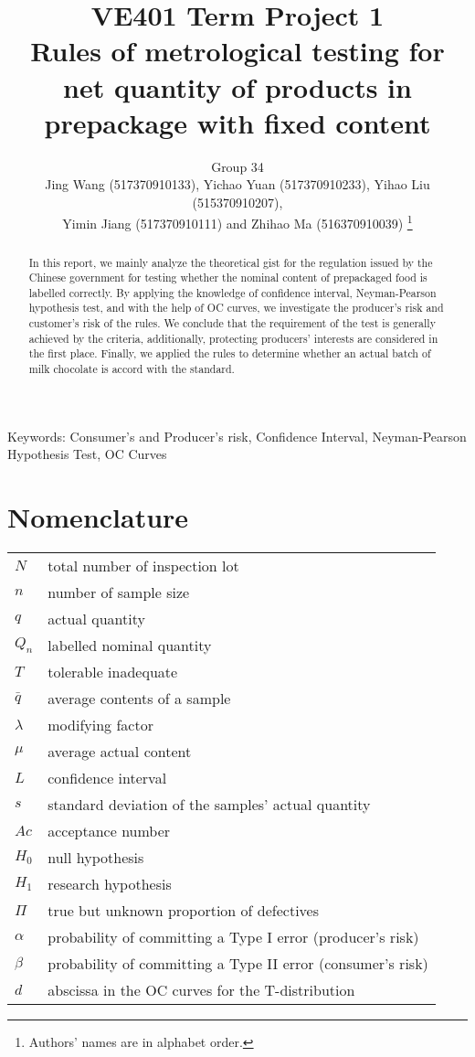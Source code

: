 \documentclass[conf]{new-aiaa}
\title{VE401 Term Project 1\\
Rules of metrological testing for net quantity of products in prepackage with fixed content}
\author{Group 34\\
Jing Wang (517370910133), 
Yichao Yuan (517370910233),
Yihao Liu (515370910207), \\
Yimin Jiang (517370910111) and
Zhihao Ma (516370910039) \footnote{Authors' names are in alphabet order.}
}
\affil{University OF Michigan - Shanghai Jiao Tong University Joint Institute, Shanghai, China}
\begin{document}
\maketitle

\begin{abstract}
    In this report, we mainly analyze the theoretical gist for the regulation issued by the Chinese government for testing whether the nominal content of prepackaged food is labelled correctly. By applying the knowledge of confidence interval, Neyman-Pearson hypothesis test, and with the help of OC curves, we investigate the producer's risk and customer's risk of the rules. We conclude that the requirement of the test is generally achieved by the criteria, additionally, protecting producers' interests are considered in the first place. Finally, we applied the rules to determine whether an actual batch of milk chocolate is accord with the standard.
\end{abstract}

\vspace{11cm}
\noindent Keywords: Consumer's and Producer's risk, Confidence Interval, Neyman-Pearson Hypothesis Test, OC Curves

\newpage

\tableofcontents
\newpage


\section{Nomenclature}

{\renewcommand\arraystretch{1.0}
\noindent\begin{longtable*}{@{}l @{\quad=\quad} l@{}}
$N$ & total number of inspection lot \\
$n$ & number of sample size \\
$q$ & actual quantity \\
$Q_n$ & labelled nominal quantity \\
$T$ & tolerable inadequate \\
$\bar{q}$ & average contents of a sample \\
$\lambda$ & modifying factor \\
$\mu$ & average actual content \\
$L$ & confidence interval \\
$s$ & standard deviation of the samples' actual quantity  \\
$Ac$ & acceptance number \\
$H_0$ & null hypothesis \\
$H_1$ & research hypothesis \\
$\Pi$ & true but unknown proportion of defectives \\
$\alpha$ & probability of committing a Type I error (producer’s risk) \\
$\beta$ & probability of committing a Type II error (consumer’s risk) \\
$d$ & abscissa in the OC curves for the T-distribution
\end{longtable*}}
\end{document}
